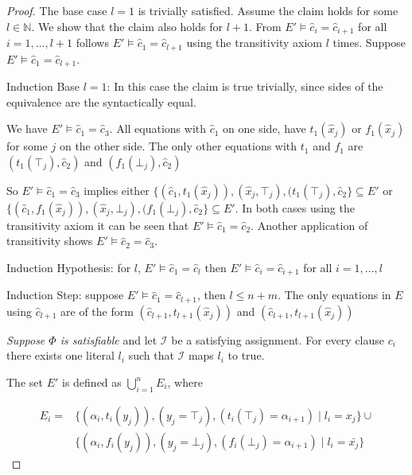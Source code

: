 \begin{proof}
The base case $l = 1$ is trivially satisfied.
Assume the claim holds for some $l \in \mathbb{N}$.
We show that the claim also holds for $l+1$.
From $E' \models \hat{c}_i = \hat{c}_{i+1}$ for all $i = 1,\ldots,l+1$ follows $E' \models \hat{c}_1 = \hat{c}_{l+1}$ using the transitivity axiom $l$ times.
Suppose $E' \models \hat{c}_1 = \hat{c}_{l+1}$. 

\begin{paragraph}{Induction Base $l = 1$:}
In this case the claim is true trivially, since sides of the equivalence are the syntactically equal.

We have $E' \models \hat{c}_1 = \hat{c}_{3}$.
All equations with $\hat{c}_1$ on one side, have $t_1(\hat{x}_j)$ or $f_1(\hat{x}_j)$ for some $j$ on the other side.
The only other equations with $t_1$ and $f_1$ are $(t_1(\top_j), \hat{c}_2)$ and $(f_1(\bot_j), \hat{c}_2)$

So $E' \models \hat{c}_1 = \hat{c}_{3}$ implies either $\{(\hat{c}_1, t_1(\hat{x}_j)), (\hat{x}_j,\top_j), (t_1(\top_j),\hat{c}_2\} \subseteq E'$ or $\{(\hat{c}_1, f_1(\hat{x}_j)), (\hat{x}_j,\bot_j), (f_1(\bot_j),\hat{c}_2\} \subseteq E'$. 
In both cases using the transitivity axiom it can be seen that $E' \models \hat{c}_1 = \hat{c}_{2}$.
Another application of transitivity shows $E' \models \hat{c}_2 = \hat{c}_{3}$.
\end{paragraph}

\begin{paragraph}{Induction Hypothesis:}
for $l$, $E' \models \hat{c}_1 = \hat{c}_{l}$ then $E' \models \hat{c}_i = \hat{c}_{i+1}$ for all $i = 1,\ldots,l$
\end{paragraph}

\begin{paragraph}{Induction Step:} 
suppose $E' \models \hat{c}_1 = \hat{c}_{l+1}$, then $l \leq n+m$.
The only equations in $E$ using $\hat{c}_{l+1}$ are of the form $(\hat{c}_{l+1},t_{l+1}(\hat{x}_j))$ and $(\hat{c}_{l+1},t_{l+1}(\hat{x}_j))$
\end{paragraph}



\emph{Suppose $\Phi$ is satisfiable} and let $\mathcal{I}$ be a satisfying assignment.
For every clause $c_i$ there exists one literal $l_i$ such that $\mathcal{I}$ maps $l_i$ to true.

The set $E'$ is defined as $\bigcup_{i = 1}^{n}{E_i}$, where

\begin{align*}
E_i = &\{ (\alpha_i,t_i(y_j)),(y_j = \top_j),(t_i(\top_j) = \alpha_{i+1}) \mid l_i = x_j\} \cup \\
& \{ (\alpha_i,f_i(y_j)),(y_j = \bot_j),(f_i(\bot_j) = \alpha_{i+1}) \mid l_i = \bar{x_j}\}
\end{align*}


\end{proof}
